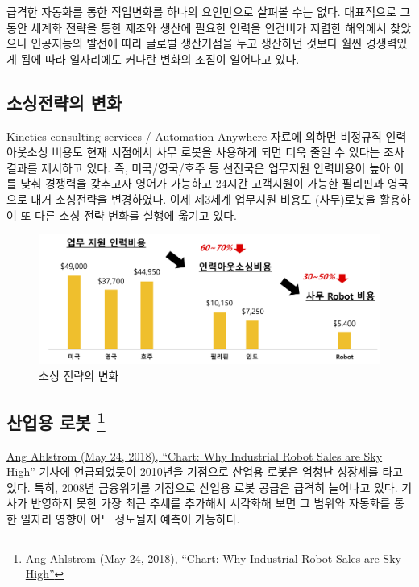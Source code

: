 \documentclass[smallextended]{svjour3}       %
\begin{document}
급격한 자동화를 통한 직업변화를 하나의 요인만으로 살펴볼 수는 없다.
대표적으로 그동안 세계화 전략을 통한 제조와 생산에 필요한 인력을
인건비가 저렴한 해외에서 찾았으나 인공지능의 발전에 따라 글로벌
생산거점을 두고 생산하던 것보다 훨씬 경쟁력있게 됨에 따라 일자리에도
커다란 변화의 조짐이 일어나고 있다.

\hypertarget{strategy-change}{%
\subsection{소싱전략의 변화}\label{strategy-change}}

Kinetics consulting services / Automation Anywhere 자료에 의하면
비정규직 인력아웃소싱 비용도 현재 시점에서 사무 로봇을 사용하게 되면
더욱 줄일 수 있다는 조사결과를 제시하고 있다. 즉, 미국/영국/호주 등
선진국은 업무지원 인력비용이 높아 이를 낮춰 경쟁력을 갖추고자 영어가
가능하고 24시간 고객지원이 가능한 필리핀과 영국으로 대거 소싱전략을
변경하였다. 이제 제3세계 업무지원 비용도 (사무)로봇을 활용하여 또 다른
소싱 전략 변화를 실행에 옮기고 있다.

\begin{figure}

{\centering \includegraphics[width=1\linewidth]{fig/the-end-of-outsourcing} 

}

\caption{소싱 전략의 변화}\label{fig:unnamed-chunk-3}
\end{figure}

\hypertarget{industrial-robot}{%
\subsection[산업용 로봇 ]{\texorpdfstring{산업용 로봇
\footnote{\href{https://www.visualcapitalist.com/industrial-robot-sales-sky-high/}{Ang
  Ahlstrom (May 24, 2018), ``Chart: Why Industrial Robot Sales are Sky
  High''}}}{산업용 로봇 }}\label{industrial-robot}}

\href{https://www.visualcapitalist.com/industrial-robot-sales-sky-high/}{Ang
Ahlstrom (May 24, 2018), ``Chart: Why Industrial Robot Sales are Sky
High''} 기사에 언급되었듯이 2010년을 기점으로 산업용 로봇은 엄청난
성장세를 타고 있다. 특히, 2008년 금융위기를 기점으로 산업용 로봇 공급은
급격히 늘어나고 있다. 기사가 반영하지 못한 가장 최근 추세를 추가해서
시각화해 보면 그 범위와 자동화를 통한 일자리 영향이 어느 정도될지 예측이
가능하다.
\end{document}
